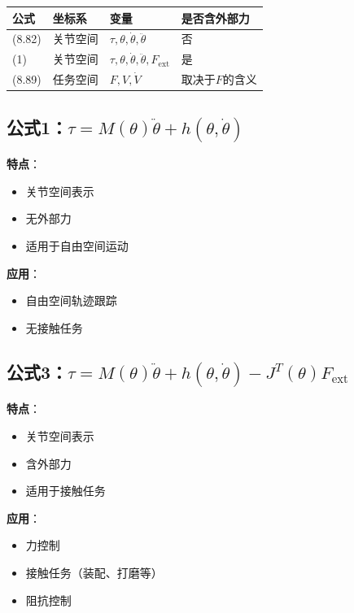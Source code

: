 \documentclass[12pt,a4paper]{article}
\begin{document}
\begin{center}
\begin{tabular}{|l|l|l|l|}
\hline
\textbf{公式} & \textbf{坐标系} & \textbf{变量} & \textbf{是否含外部力} \\
\hline
(8.82) & 关节空间 & $\tau, \theta, \dot{\theta}, \ddot{\theta}$ & 否 \\
\hline
(1) & 关节空间 & $\tau, \theta, \dot{\theta}, \ddot{\theta}, F_{\text{ext}}$ & 是 \\
\hline
(8.89) & 任务空间 & $F, V, \dot{V}$ & 取决于$F$的含义 \\
\hline
\end{tabular}
\end{center}

\subsection{公式1：$\tau = M(\theta)\ddot{\theta} + h(\theta, \dot{\theta})$}

\textbf{特点}：
\begin{itemize}
\item 关节空间表示
\item 无外部力
\item 适用于自由空间运动
\end{itemize}

\textbf{应用}：
\begin{itemize}
\item 自由空间轨迹跟踪
\item 无接触任务
\end{itemize}

\subsection{公式3：$\tau = M(\theta)\ddot{\theta} + h(\theta, \dot{\theta}) - J^T(\theta)F_{\text{ext}}$}

\textbf{特点}：
\begin{itemize}
\item 关节空间表示
\item 含外部力
\item 适用于接触任务
\end{itemize}

\textbf{应用}：
\begin{itemize}
\item 力控制
\item 接触任务（装配、打磨等）
\item 阻抗控制
\end{itemize}
\end{document}
